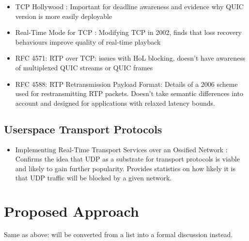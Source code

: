 \documentclass{mprop}
\begin{document}
\begin{itemize}
  \item TCP Hollywood \cite{McQuistin2016}: Important for deadline awareness and evidence why 
  QUIC version is more easily deployable

  \item Real-Time Mode for TCP \cite{Liang2002}: Modifying TCP in 2002, finds that loss recovery 
  behaviours improve quality of real-time playback

  \item RFC 4571: RTP over TCP: issues with HoL blocking, doesn't have awareness of multiplexed 
  QUIC streams or QUIC frames

  \item RFC 4588: RTP Retransmission Payload Format: Details of a 2006 scheme used for 
  restransmitting RTP packets. Doesn't take semantic differences into account and designed for 
  applications with relaxed latency bounds.
\end{itemize}

\subsection{Userspace Transport Protocols}

\begin{itemize}
  \item Implementing Real-Time Transport Services over an Ossified Network 
  \cite {McQuistin2016Ossification}: Confirms the idea that UDP as a substrate for transport 
  protocols is viable and likely to gain further popularity. Provides statistics on how likely it 
  is that UDP traffic will be blocked by a given network.
\end{itemize}

\newpage

\section{Proposed Approach}


Same as above: will be converted from a list into a formal discussion instead.
\end{document}
